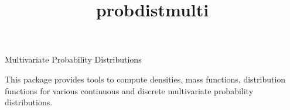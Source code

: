 \documentclass[12pt]{article}
\begin{document}
\begin{titlepage}

\title{probdistmulti}{Multivariate Probability Distributions}


This package provides tools to compute densities, mass functions, 
distribution functions 
for various continuous and discrete multivariate probability distributions.

\vfill
\end{titlepage}


\tableofcontents
{}
























\end{document}
